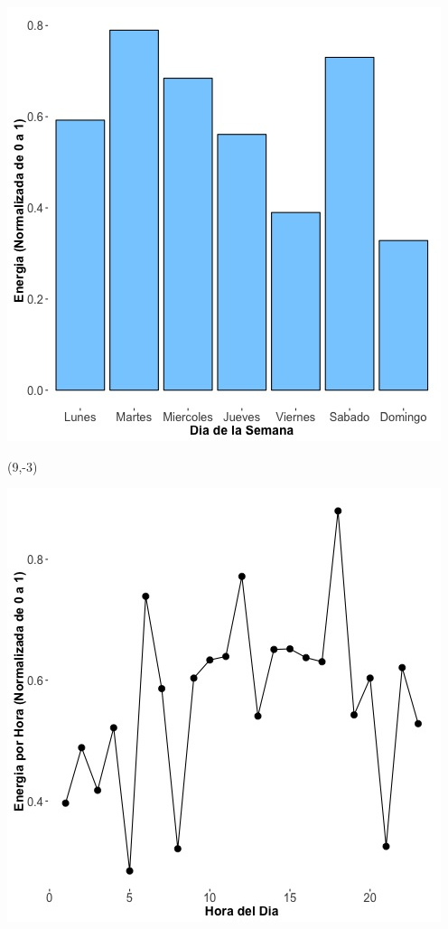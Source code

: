 \documentclass{article}\usepackage[]{graphicx}\usepackage[]{color}
\newenvironment{knitrout}{}{} %
\begin{document}
\begin{knitrout}
\color{fgcolor}
\includegraphics[scale=0.65]{figure/A18_day_of_week_plot} 
\end{knitrout}


 \begin{textblock}{1}(9,-3)
\begin{minipage}{20em}
\begingroup

\endgroup
\end{minipage}
\end{textblock}

 \vspace{2cm}

\begin{knitrout}
\color{fgcolor}
\includegraphics[scale=0.75]{figure/A18_fplot_norm_median} 
\end{knitrout}
\end{document}
